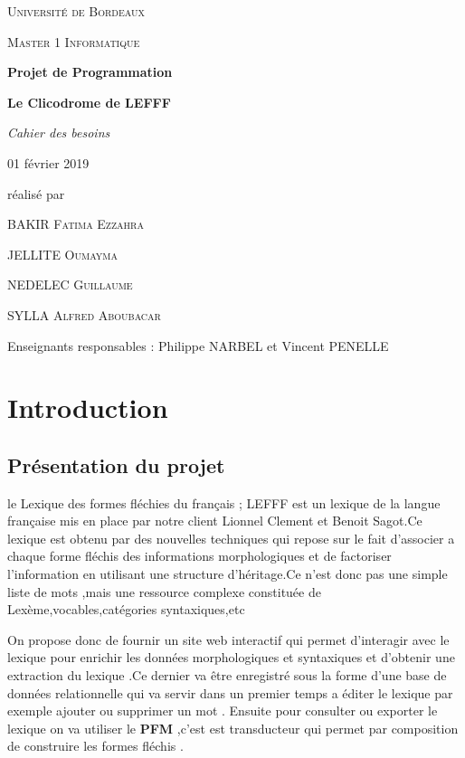 \documentclass[12pt,a4paper]{article}
\begin{document}
\begin{titlepage}
\centering
{\scshape\LARGE Université de Bordeaux \par}
{\scshape\Large Master 1 Informatique  \par}
\vspace{3cm}

{\Huge\bfseries Projet de Programmation\par}
{\Huge\bfseries Le Clicodrome de LEFFF \par}
\vspace{0.5cm}
{\Large\itshape Cahier des besoins\par}
{\large 01 février 2019\par}

\vfill
réalisé par \par
BAKIR \textsc{Fatima Ezzahra} \par
JELLITE \textsc{Oumayma} \par
NEDELEC \textsc{Guillaume} \par
SYLLA  \textsc{Alfred Aboubacar} \par
\vfill

{\large Enseignants responsables : Philippe NARBEL et Vincent PENELLE\par}

\end{titlepage}

\tableofcontents

\newpage\section{Introduction}

\subsection{Présentation du projet}


\smallbreak
le Lexique des formes fléchies du français ; LEFFF est un lexique de la langue française mis en place par notre client Lionnel Clement et Benoit Sagot.Ce lexique est obtenu par des nouvelles techniques qui repose sur le fait d'associer a chaque forme fléchis des informations morphologiques et de factoriser l'information en utilisant une structure d'héritage.Ce n'est donc pas une simple liste de mots ,mais une ressource complexe constituée de Lexème,vocables,catégories syntaxiques,etc

 On propose donc de fournir un site web interactif qui permet d'interagir avec le lexique pour enrichir les données morphologiques et syntaxiques et d'obtenir une extraction du lexique .Ce dernier va être enregistré sous la forme d'une base de données relationnelle qui va servir dans un premier temps a éditer le lexique par exemple ajouter ou supprimer un mot . Ensuite pour consulter ou exporter le lexique on va utiliser le \textbf{PFM} ,c'est est transducteur qui permet par composition de construire les formes fléchis .
\end{document}
